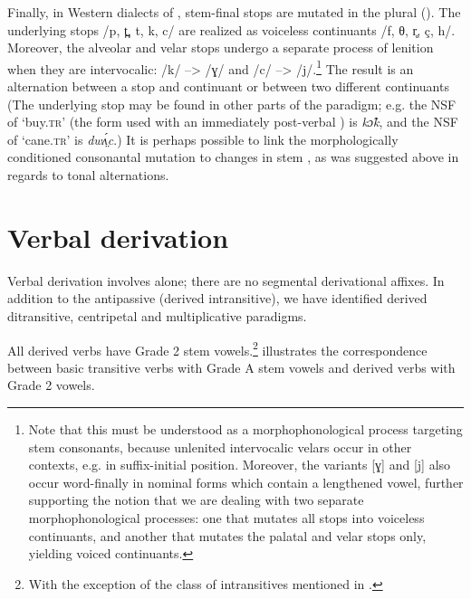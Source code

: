 \documentclass[output=paper,newtxmath,modfonts,nonflat,draftmode]{langsci/langscibook}
\begin{document}
Finally, in Western dialects of , stem-final stops are mutated in the plural (). The underlying stops /p, t̪, t, k, c/ are realized as voiceless continuants /f, θ, r̥, ç, h/. Moreover, the alveolar and velar stops undergo a separate process of lenition when they are intervocalic: /k/ --> /ɣ/ and /c/ --> /j/.\footnote{Note\label{fn:monich:8} that this must be understood as a morphophonological process targeting stem consonants, because unlenited intervocalic velars occur in other contexts, e.g. in suffix-initial position. Moreover, the variants [ɣ] and [j] also occur word-finally in nominal forms which contain a lengthened vowel, further supporting the notion that we are dealing with two separate morphophonological  processes: one that mutates all stops into voiceless continuants, and another that mutates the palatal and velar stops only, yielding voiced continuants.} The result is an alternation between a stop and continuant or between two different continuants (The underlying stop may be found in other parts of the paradigm; e.g. the NSF of ‘buy.\textsc{tr}’ (the form used with an immediately post-verbal ) is \textit{kɔ̂k}, and the NSF of ‘cane.\textsc{tr}’ is \textit{dwʌ̤́c}.) It is perhaps possible to link the morphologically conditioned consonantal mutation to changes in stem , as was suggested above in regards to tonal alternations.



\section{Verbal derivation} %

Verbal derivation involves  alone; there are no segmental derivational affixes. In addition to the antipassive (derived intransitive), we have identified derived ditransitive, centripetal and multiplicative paradigms.

All derived verbs have Grade 2 stem vowels.\footnote{With\label{fn:monich:9} the exception of the class of intransitives mentioned in  .}  illustrates the correspondence between basic transitive verbs with Grade A stem vowels and derived verbs with Grade 2 vowels.
\end{document}
